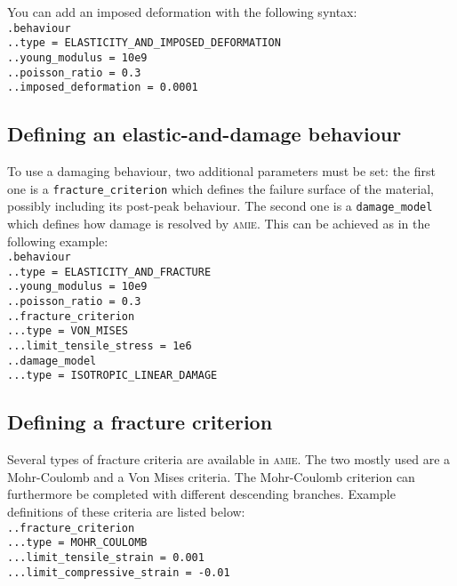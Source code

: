 \documentclass[10pt]{article}
\begin{document}
You can add an imposed deformation with the following syntax:\\

\noindent \verb+.behaviour+\\
\verb+..type = ELASTICITY_AND_IMPOSED_DEFORMATION+\\
\verb+..young_modulus = 10e9+\\
\verb+..poisson_ratio = 0.3+\\
\verb+..imposed_deformation = 0.0001+

\subsection{Defining an elastic-and-damage behaviour}

To use a damaging behaviour, two additional parameters must be set: the first one is a \verb+fracture_criterion+ which defines the failure surface of the material, possibly including its post-peak behaviour. The second one is a \verb+damage_model+ which defines how damage is resolved by \textsc{amie}. This can be achieved as in the following example:\\

\noindent \verb+.behaviour+\\
\verb+..type = ELASTICITY_AND_FRACTURE+\\
\verb+..young_modulus = 10e9+\\
\verb+..poisson_ratio = 0.3+\\
\verb+..fracture_criterion+\\
\verb+...type = VON_MISES+\\
\verb+...limit_tensile_stress = 1e6+\\
\verb+..damage_model+\\
\verb+...type = ISOTROPIC_LINEAR_DAMAGE+

\subsection{Defining a fracture criterion}

Several types of fracture criteria are available in \textsc{amie}. The two mostly used are a Mohr-Coulomb and a Von Mises criteria. The Mohr-Coulomb criterion can furthermore be completed with different descending branches. Example definitions of these criteria are listed below:\\

\noindent \verb+..fracture_criterion+\\
\verb+...type = MOHR_COULOMB+\\
\verb+...limit_tensile_strain = 0.001+\\
\verb+...limit_compressive_strain = -0.01+\\
\end{document}
